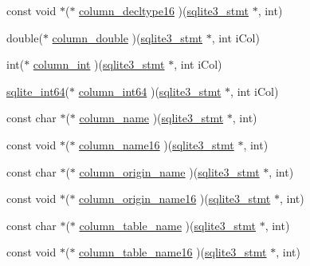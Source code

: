 \begin{DoxyCompactItemize}
const void $\ast$($\ast$ \hyperlink{structsqlite3__api__routines_af5504d756c0ad0526acd0c44f9b2239a}{column\+\_\+decltype16} )(\hyperlink{sqlite3_8h_af2a033da1327cdd77f0a174a09aedd0c}{sqlite3\+\_\+stmt} $\ast$, int)
\item 
double($\ast$ \hyperlink{structsqlite3__api__routines_a6f10fb7f35cebf6cb62a77adfdc70efc}{column\+\_\+double} )(\hyperlink{sqlite3_8h_af2a033da1327cdd77f0a174a09aedd0c}{sqlite3\+\_\+stmt} $\ast$, int i\+Col)
\item 
int($\ast$ \hyperlink{structsqlite3__api__routines_a066b63e4ca0f83af9eaba45b8db3e6be}{column\+\_\+int} )(\hyperlink{sqlite3_8h_af2a033da1327cdd77f0a174a09aedd0c}{sqlite3\+\_\+stmt} $\ast$, int i\+Col)
\item 
\hyperlink{sqlite3_8h_a520a95f9080c018b2fade39885bd2e2a}{sqlite\+\_\+int64}($\ast$ \hyperlink{structsqlite3__api__routines_a6992d17196cce6a9c893df0e69ea8b17}{column\+\_\+int64} )(\hyperlink{sqlite3_8h_af2a033da1327cdd77f0a174a09aedd0c}{sqlite3\+\_\+stmt} $\ast$, int i\+Col)
\item 
const char $\ast$($\ast$ \hyperlink{structsqlite3__api__routines_a8ae08c78d80fae61c0abeb80a7cd70f5}{column\+\_\+name} )(\hyperlink{sqlite3_8h_af2a033da1327cdd77f0a174a09aedd0c}{sqlite3\+\_\+stmt} $\ast$, int)
\item 
const void $\ast$($\ast$ \hyperlink{structsqlite3__api__routines_a14ff9b029639553e11e610281097dfc7}{column\+\_\+name16} )(\hyperlink{sqlite3_8h_af2a033da1327cdd77f0a174a09aedd0c}{sqlite3\+\_\+stmt} $\ast$, int)
\item 
const char $\ast$($\ast$ \hyperlink{structsqlite3__api__routines_a944609a2b514a9002e3c76575ad3bd65}{column\+\_\+origin\+\_\+name} )(\hyperlink{sqlite3_8h_af2a033da1327cdd77f0a174a09aedd0c}{sqlite3\+\_\+stmt} $\ast$, int)
\item 
const void $\ast$($\ast$ \hyperlink{structsqlite3__api__routines_a29f148c32e2e8aba50d3ff3ffd8c4f90}{column\+\_\+origin\+\_\+name16} )(\hyperlink{sqlite3_8h_af2a033da1327cdd77f0a174a09aedd0c}{sqlite3\+\_\+stmt} $\ast$, int)
\item 
const char $\ast$($\ast$ \hyperlink{structsqlite3__api__routines_a06525d1223f774274ff49b287d33a952}{column\+\_\+table\+\_\+name} )(\hyperlink{sqlite3_8h_af2a033da1327cdd77f0a174a09aedd0c}{sqlite3\+\_\+stmt} $\ast$, int)
\item 
const void $\ast$($\ast$ \hyperlink{structsqlite3__api__routines_a3252c82d0f2ed7e88a76f26585d13bbb}{column\+\_\+table\+\_\+name16} )(\hyperlink{sqlite3_8h_af2a033da1327cdd77f0a174a09aedd0c}{sqlite3\+\_\+stmt} $\ast$, int)

\end{DoxyCompactItemize}
